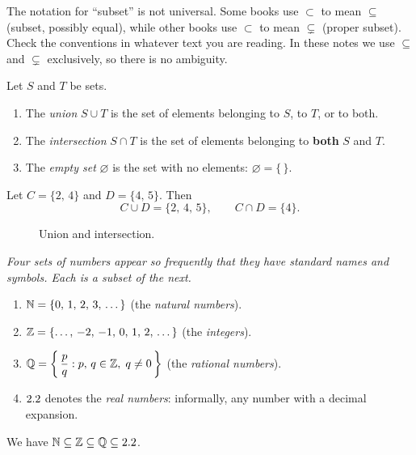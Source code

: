 \begin{remark}[Warning]
The notation for ``subset'' is not universal.  Some books use $\subset$ to mean $\subseteq$ (subset, possibly equal), while other books use $\subset$ to mean $\subsetneq$ (proper subset).  Check the conventions in whatever text you are reading.  In these notes we use $\subseteq$ and $\subsetneq$ exclusively, so there is no ambiguity.
\end{remark}

\begin{definition}
\label{def:1-3}
Let $S$ and $T$ be sets.
\begin{enumerate}[label=(\roman*)]
  \item The \emph{union} $S \cup T$ is the set of elements belonging to $S$, to $T$, or to both.
  \item The \emph{intersection} $S \cap T$ is the set of elements belonging to \textbf{both} $S$ and $T$.
  \item The \emph{empty set} $\varnothing$ is the set with no elements: $\varnothing = \{\,\}$.
\end{enumerate}
\end{definition}

\begin{example}
\label{ex:1-1}
Let $C = \{2,\,4\}$ and $D = \{4,\,5\}$.  Then
\[
  C \cup D = \{2,\,4,\,5\}, \qquad C \cap D = \{4\}.
\]
\end{example}

\begin{figure}[ht]
  \centering
  
  \caption{Union and intersection.}
  \label{fig:venn-union-intersection}
\end{figure}

\textit{Four sets of numbers appear so frequently that they have standard names and symbols.  Each is a subset of the next.}

\begin{definition}
\label{def:1-4}
\begin{enumerate}[label=(\roman*)]
  \item $\mathbb{N} = \{0,\,1,\,2,\,3,\,\dots\}$ \quad (the \emph{natural numbers}).
  \item $\mathbb{Z} = \{\dots,\,-2,\,-1,\,0,\,1,\,2,\,\dots\}$ \quad (the \emph{integers}).
  \item $\mathbb{Q} = \left\{\,\dfrac{p}{q} : p,\,q \in \mathbb{Z},\; q \neq 0\,\right\}$ \quad (the \emph{rational numbers}).
  \item $2.2$ denotes the \emph{real numbers}: informally, any number with a decimal expansion.
\end{enumerate}
We have $\mathbb{N} \subseteq \mathbb{Z} \subseteq \mathbb{Q} \subseteq 2.2$.
\end{definition}


